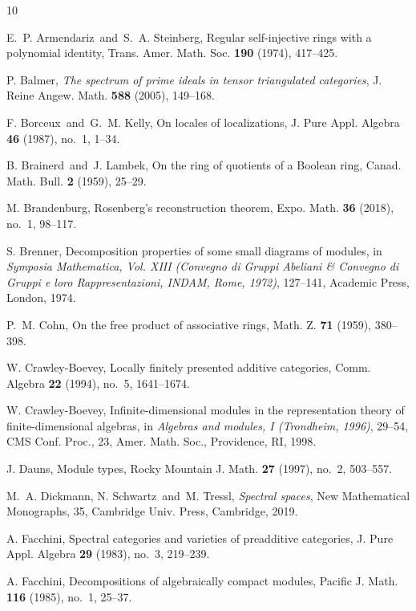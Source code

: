 \documentclass[a4paper]{amsart}
\theoremstyle{plain}
\theoremstyle{definition}
\theoremstyle{remark}
\numberwithin{equation}{section}
\begin{document}
\begin{thebibliography}{10}

 E.~P. Armendariz\ and\ S.~A. Steinberg, Regular
  self-injective rings with a polynomial identity,
  Trans. Amer. Math. Soc. {\bf 190} (1974), 417--425.

 P. Balmer, \emph{The spectrum of prime ideals in
    tensor triangulated categories}, J. Reine
  Angew. Math. \textbf{588} (2005), 149--168.

 F. Borceux\ and\ G.~M. Kelly, On locales of
  localizations, J. Pure Appl. Algebra {\bf 46} (1987), no.~1, 1--34.

 B. Brainerd\ and\ J. Lambek, On the ring of quotients
  of a Boolean ring, Canad. Math. Bull. {\bf 2} (1959), 25--29.

 M. Brandenburg, Rosenberg's reconstruction theorem,
  Expo. Math. {\bf 36} (2018), no.~1, 98--117.

 S. Brenner, Decomposition properties of some small
  diagrams of modules, in {\it Symposia Mathematica, Vol. XIII
    (Convegno di Gruppi Abeliani \& Convegno di Gruppi e loro
    Rappresentazioni, INDAM, Rome, 1972)}, 127--141, Academic Press,
  London, 1974.

 P.~M. Cohn, On the free product of associative rings,
  Math. Z. {\bf 71} (1959), 380--398.

 W. Crawley-Boevey, Locally finitely presented
  additive categories, Comm. Algebra {\bf 22} (1994), no.~5,
  1641--1674.

 W. Crawley-Boevey, Infinite-dimensional modules in
  the representation theory of finite-dimensional algebras, in {\it
    Algebras and modules, I (Trondheim, 1996)}, 29--54, CMS
  Conf. Proc., 23, Amer. Math. Soc., Providence, RI, 1998.

 J. Dauns, Module types, Rocky Mountain J. Math. {\bf
    27} (1997), no.~2, 503--557.
  
 M.~A. Dickmann, N. Schwartz\ and\ M. Tressl, {\it
    Spectral spaces}, New Mathematical Monographs, 35, Cambridge
  Univ. Press, Cambridge, 2019.

 A. Facchini, Spectral categories and varieties of
  preadditive categories, J. Pure Appl. Algebra {\bf 29} (1983),
  no.~3, 219--239.

 A. Facchini, Decompositions of algebraically compact
  modules, Pacific J. Math. {\bf 116} (1985), no.~1, 25--37.


\end{thebibliography}
\end{document}
